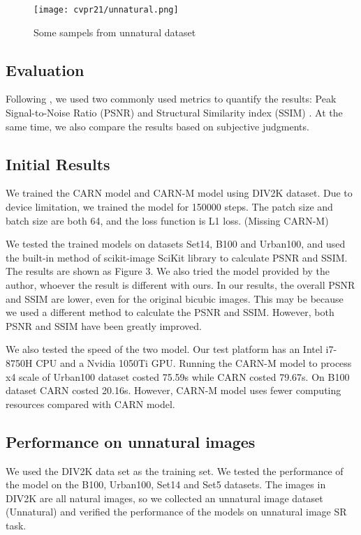 \documentclass[final]{cvpr}
\begin{document}
\begin{figure}[ht]
\begin{center}
    \texttt{[image: cvpr21/unnatural.png]}
\end{center}
   \caption{Some sampels from unnatural dataset}
\label{unnatural}
\end{figure}

\subsection{Evaluation}

Following \cite{r1}, we used two commonly used metrics to quantify the results: Peak Signal-to-Noise Ratio (PSNR) and Structural Similarity index (SSIM) \cite{r12}. At the same time, we also compare the results based on subjective judgments. 

\subsection{Initial Results}

We trained the CARN model and CARN-M model using DIV2K dataset. Due to device limitation, we trained the model for 150000 steps. The patch size and batch size are both 64, and the loss function is L1 loss. (Missing CARN-M) 

We tested the trained models on datasets Set14, B100 and Urban100, and used the built-in method of scikit-image SciKit library to calculate PSNR and SSIM. The results are shown as Figure 3. We also tried the model provided by the author, whoever the result is different with ours. In our results, the overall PSNR and SSIM are lower, even for the original bicubic images. This may be because we used a different method to calculate the PSNR and SSIM. However, both PSNR and SSIM have been greatly improved.  

We also tested the speed of the two model. Our test platform has an Intel i7-8750H CPU and a Nvidia 1050Ti GPU. Running the CARN-M model to process x4 scale of Urban100 dataset costed 75.59s while CARN costed 79.67s. On B100 dataset CARN costed 20.16s. However, CARN-M model uses fewer computing resources compared with CARN model.

\subsection{Performance on unnatural images}

We used the DIV2K data set as the training set. We tested the performance of the model on the B100, Urban100, Set14 and Set5 datasets. The images in DIV2K are all natural images, so we collected an unnatural image dataset (Unnatural) and verified the performance of the models on unnatural image SR task.  
\end{document}
